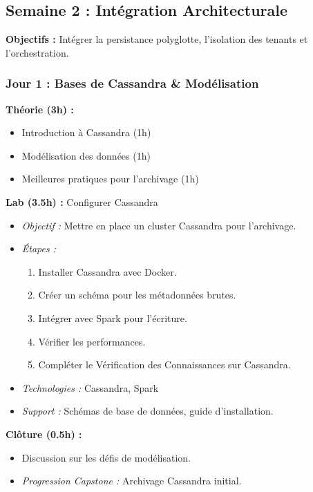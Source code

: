 \documentclass[11pt]{article}
\begin{document}
\subsection{Semaine 2 : Intégration Architecturale}
\textbf{Objectifs :} Intégrer la persistance polyglotte, l'isolation des tenants et l'orchestration.

\subsubsection{Jour 1 : Bases de Cassandra \& Modélisation}
\textbf{Théorie (3h) :}
\begin{itemize}
    \item Introduction à Cassandra (1h)
    \item Modélisation des données (1h)
    \item Meilleures pratiques pour l'archivage (1h)
\end{itemize}
\textbf{Lab (3.5h) :} Configurer Cassandra
\begin{itemize}
    \item \textit{Objectif :} Mettre en place un cluster Cassandra pour l'archivage.
    \item \textit{Étapes :}
        \begin{enumerate}
            \item Installer Cassandra avec Docker.
            \item Créer un schéma pour les métadonnées brutes.
            \item Intégrer avec Spark pour l'écriture.
            \item Vérifier les performances.
            \item Compléter le Vérification des Connaissances sur Cassandra.
        \end{enumerate}
    \item \textit{Technologies :} Cassandra, Spark
    \item \textit{Support :} Schémas de base de données, guide d'installation.
\end{itemize}
\textbf{Clôture (0.5h) :}
\begin{itemize}
    \item Discussion sur les défis de modélisation.
    \item \textit{Progression Capstone :} Archivage Cassandra initial.
\end{itemize}
\end{document}

